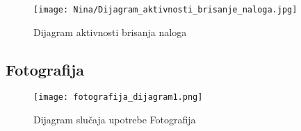 \documentclass[a4paper]{article}
\begin{document}
\begin{figure}[H]
    \centering
    \texttt{[image: Nina/Dijagram\_aktivnosti\_brisanje\_naloga.jpg]}
    \caption{Dijagram aktivnosti brisanja naloga}
    \label{fig:RegistracijaZ}
\end{figure}


\subsection{Fotografija}

\begin{figure}[htp]
    \centering
    \texttt{[image: fotografija\_dijagram1.png]}
    \caption{Dijagram slučaja upotrebe Fotografija}
    \label{fig:PrenosiviBar}
\end{figure}
\end{document}
